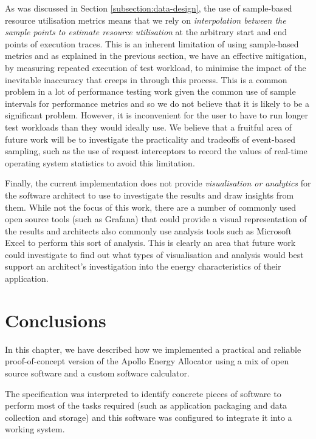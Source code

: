 As was discussed in Section \ref{subsection:data-design}, the use of sample-based resource utilisation metrics means that we rely on \emph{interpolation between the sample points to estimate resource utilisation} at the arbitrary start and end points of execution traces.  This is an inherent limitation of using sample-based metrics and as explained in the previous section, we have an effective mitigation, by measuring repeated execution of test workload, to minimise the impact of the inevitable inaccuracy that creeps in through this process.  This is a common problem in a lot of performance testing work given the common use of sample intervals for performance metrics and so we do not believe that it is likely to be a significant problem. However, it is inconvenient for the user to have to run longer test workloads than they would ideally use.  We believe that a fruitful area of future work will be to investigate the practicality and tradeoffs of event-based sampling, such as the use of request interceptors to record the values of real-time operating system statistics to avoid this limitation.

Finally, the current implementation does not provide \emph{visualisation or analytics} for the software architect to use to investigate the results and draw insights from them.  While not the focus of this work, there are a number of commonly used open source tools (such as Grafana) that could provide a visual representation of the results and architects also commonly use analysis tools such as Microsoft Excel to perform this sort of analysis.  This is clearly an area that future work could investigate to find out what types of visualisation and analysis would best support an architect's investigation into the energy characteristics of their application.


\section{Conclusions}

In this chapter, we have described how we implemented a practical and reliable proof-of-concept version of the Apollo Energy Allocator using a mix of open source software and a custom software calculator.

The specification was interpreted to identify concrete pieces of software to perform most of the tasks required (such as application packaging and data collection and storage) and this software was configured to integrate it into a working system.

